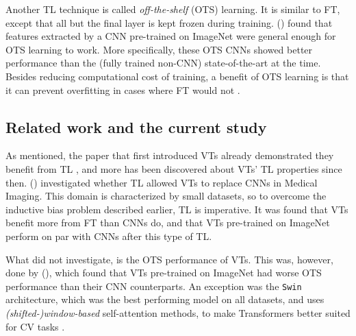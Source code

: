 
Another TL technique is called \textit{off-the-shelf} (OTS) learning. It is similar to FT, except that all but the final layer is kept frozen during training. \citeauthor{sharif2014cnn} (\citeyear{sharif2014cnn}) found that features extracted by a CNN pre-trained on ImageNet were general enough for OTS learning to work. More specifically, these OTS CNNs showed better performance than the (fully trained non-CNN) state-of-the-art at the time. Besides reducing computational cost of training, a benefit of OTS learning is that it can prevent overfitting in cases where FT would not \citep{yosinski2014transferable}.


\subsection{Related work and the current study} \label{related_work}
As mentioned, the paper that first introduced VTs already demonstrated they benefit from TL \citep{dosovitskiy2020image}, and more has been discovered about VTs' TL properties since then. \citeauthor{matsoukas2021time} (\citeyear{matsoukas2021time}) investigated whether TL allowed VTs to replace CNNs in Medical Imaging. This domain is characterized by small datasets, so to overcome the inductive bias problem described earlier, TL is imperative. It was found that VTs benefit more from FT than CNNs do, and that VTs pre-trained on ImageNet perform on par with CNNs after this type of TL.

What \citeauthor{matsoukas2021time} did not investigate, is the OTS performance of VTs. This was, however, done by \citeauthor{zhou2021convnets} (\citeyear{zhou2021convnets}), which found that VTs pre-trained on ImageNet had worse OTS performance than their CNN counterparts. An exception was the \texttt{Swin} architecture, which was the best performing model on all datasets, and uses \textit{(shifted-)window-based} self-attention methods, to make Transformers better suited for CV tasks \citep{liu2021swin}.

